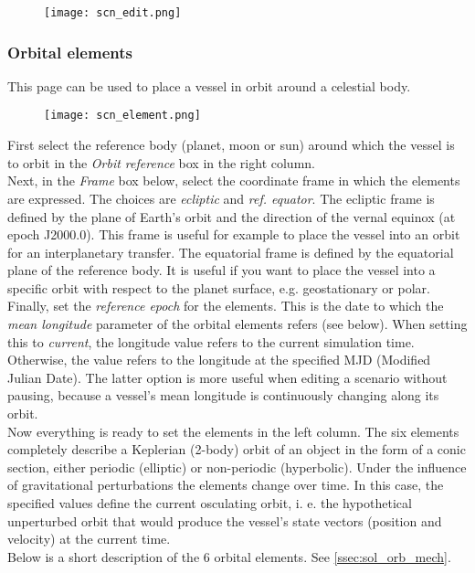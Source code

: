 \documentclass[Orbiter User Manual.tex]{subfiles}
\begin{document}
\begin{figure}[H]
	\centering
	\texttt{[image: scn\_edit.png]}
\end{figure}

\subsubsection{Orbital elements}
This page can be used to place a vessel in orbit around a celestial body.

\begin{figure}[H]
	\centering
	\texttt{[image: scn\_element.png]}
\end{figure}

\noindent
First select the reference body (planet, moon or sun) around which the vessel is to orbit in the \textit{Orbit reference} box in the right column.\\
Next, in the \textit{Frame} box below, select the coordinate frame in which the elements are expressed. The choices are \textit{ecliptic} and \textit{ref. equator}. The ecliptic frame is defined by the plane of Earth's orbit and the direction of the vernal equinox (at epoch J2000.0). This frame is useful for example to place the vessel into an orbit for an interplanetary transfer. The equatorial frame is defined by the equatorial plane of the reference body. It is useful if you want to place the vessel into a specific orbit with respect to the planet surface, e.g. geostationary or polar.\\
Finally, set the \textit{reference epoch} for the elements. This is the date to which the \textit{mean longitude} parameter of the orbital elements refers (see below). When setting this to \textit{current}, the longitude value refers to the current simulation time. Otherwise, the value refers to the longitude at the specified MJD (Modified Julian Date). The latter option is more useful when editing a scenario without pausing, because a vessel's mean longitude is continuously changing along its orbit.\\
Now everything is ready to set the elements in the left column. The six elements completely describe a Keplerian (2-body) orbit of an object in the form of a conic section, either periodic (elliptic) or non-periodic (hyperbolic). Under the influence of gravitational perturbations the  elements change over time. In this case, the specified values define the current osculating orbit, i. e. the hypothetical unperturbed orbit that would produce the vessel's state vectors (position and velocity) at the current time.\\
Below is a short description of the 6 orbital elements. See \ref{ssec:sol_orb_mech}.
\end{document}
